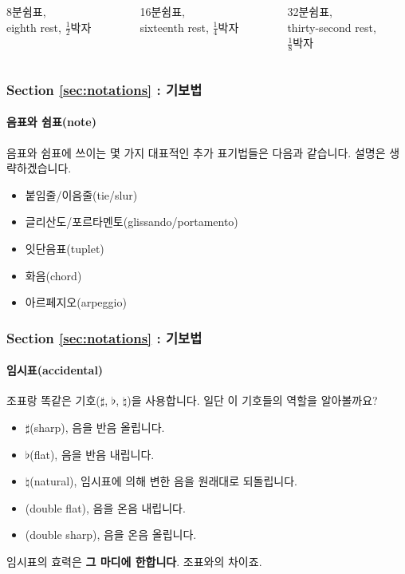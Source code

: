 \documentclass{beamer}
\newcommand*\doubleflat{{\Large\raisebox{.6ex}{\textmusix{3}}}}
\newcommand*\doublesharp{{\Large\raisebox{.6ex}{\textmusix{5}}}}
\begin{document}
\begin{frame}
\begin{columns}
\begin{column}{0.33\textwidth}
				\centering
				\small 8분쉼표,\\eighth rest, $\frac{1}{2}$박자
			\end{column}
			\begin{column}{0.33\textwidth}
				\centering
				\small 16분쉼표,\\sixteenth rest, $\frac{1}{4}$박자
			\end{column}
			\begin{column}{0.33\textwidth}
				\centering
				\small 32분쉼표,\\thirty-second rest,\\$\frac{1}{8}$박자
			\end{column}
		\end{columns}
	\end{frame}
	
	\begin{frame}
		\frametitle{Section \ref{sec:notations} : 기보법}
		\framesubtitle{음표와 쉼표(note)}
		음표와 쉼표에 쓰이는 몇 가지 대표적인 추가 표기법들은 다음과 같습니다. 설명은 생략하겠습니다.
		\begin{itemize}
			\item 붙임줄/이음줄(tie/slur)
			\item 글리산도/포르타멘토(glissando/portamento)
			\item 잇단음표(tuplet)
			\item 화음(chord)
			\item 아르페지오(arpeggio)
		\end{itemize}
	\end{frame}
	
	\begin{frame}
		\frametitle{Section \ref{sec:notations} : 기보법}
		\framesubtitle{임시표(accidental)}
		조표랑 똑같은 기호($ \sharp $, $ \flat $, $ \natural $)을 사용합니다. 일단 이 기호들의 역할을 알아볼까요?
		\begin{itemize}
			\item $ \sharp $(sharp), 음을 반음 올립니다.
			\item $ \flat $(flat), 음을 반음 내립니다.
			\item $ \natural $(natural), 임시표에 의해 변한 음을 원래대로 되돌립니다.
			\item \doubleflat(double flat), 음을 온음 내립니다.
			\item \doublesharp(double sharp), 음을 온음 올립니다.
		\end{itemize}
		임시표의 효력은 {\bf 그 마디에 한합니다}. 조표와의 차이죠.
	\end{frame}
	
\end{document}
